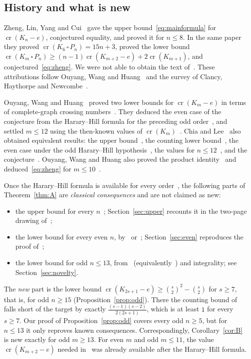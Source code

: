 \documentclass[11pt,a4paper]{article}
\theoremstyle{definition}
\theoremstyle{remark}
\numberwithin{equation}{section}
\newcommand{\crn}{\operatorname{cr}}
\begin{document}
\subsection{History and what is new}

Zheng, Lin, Yang and Cui~\cite{ZLYC} gave the upper bound~\eqref{eq:mainformula} for $\crn(K_n-e)$, conjectured equality, and proved it for $n\le 8$. In the same paper they proved $\crn(K_6\,\square\,P_n)=15n+3$, proved the lower bound $\crn(K_m\,\square\,P_n)\ge(n-1)\crn(K_{m+2}-e)+2\crn(K_{m+1})$, and conjectured~\eqref{eq:zheng}. We were not able to obtain the text of~\cite{ZLYC}. These attributions follow Ouyang, Wang and Huang~\cite[Section~1, display~(1.1)--(1.2), and Lemma~2.3]{OWH} and the survey of Clancy, Haythorpe and Newcombe~\cite[Theorem~2.19, Conjecture~2.20, Theorems~3.12--3.13, Conjecture~3.14]{CHN}.

Ouyang, Wang and Huang~\cite{OWH} proved two lower bounds for $\crn(K_m-e)$ in terms of complete-graph crossing numbers~\cite[Theorems~3.1 and~3.2]{OWH}. They deduced the even case of the conjecture from the Harary--Hill formula for the preceding odd order~\cite[Theorem~3.3]{OWH}, and settled $m\le 12$ using the then-known values of $\crn(K_m)$~\cite[Theorem~3.4]{OWH}. Chia and Lee~\cite{ChiaLee} also obtained equivalent results: the upper bound~\cite[Lemma~1]{ChiaLee}, the counting lower bound~\cite[Theorem~1]{ChiaLee}, the even case under the odd Harary--Hill hypothesis~\cite[Theorem~2]{ChiaLee}, the values for $n\le12$~\cite[Corollary~1]{ChiaLee}, and the conjecture~\cite[Conjecture~1]{ChiaLee}. Ouyang, Wang and Huang also proved the product identity~\cite[Corollary~5.1]{OWH} and deduced~\eqref{eq:zheng} for $m\le 10$~\cite[Corollary~5.2]{OWH}.

Once the Harary--Hill formula is available for every order~\cite{OAIKn}, the following parts of Theorem~\ref{thm:A} are \emph{classical consequences} and are not claimed as new:
\begin{itemize}[leftmargin=1.5em]
\item the upper bound for every $n$~\cite{ZLYC,ChiaLee}; Section~\ref{sec:upper} recounts it in the two-page drawing of~\cite{OAIKn};
\item the lower bound for every even $n$, by~\cite[Theorem~3.3]{OWH} or~\cite[Theorem~2]{ChiaLee}; Section~\ref{sec:even} reproduces the proof of~\cite[Theorem~3.2]{OWH};
\item the lower bound for odd $n\le 13$, from~\cite[Theorem~3.1]{OWH} (equivalently~\cite[Theorem~1]{ChiaLee}) and integrality; see Section~\ref{sec:novelty}.
\end{itemize}
The \emph{new} part is the lower bound $\crn(K_{2s+1}-e)\ge\binom s2^2-\binom s2$ for $s\ge7$, that is, for odd $n\ge 15$ (Proposition~\ref{prop:odd}). There the counting bound of~\cite[Theorem~3.1]{OWH} falls short of the target by exactly $\frac{(s-1)(s-2)}{2(2s+1)}$, which is at least $1$ for every $s\ge 7$. Our proof of Proposition~\ref{prop:odd} covers every odd $n\ge5$, but for $n\le13$ it only reproves known consequences. Correspondingly, Corollary~\ref{cor:B} is new exactly for odd $m\ge 13$. For even $m$ and odd $m\le11$, the value $\crn(K_{m+2}-e)$ needed in~\cite[Corollary~5.1]{OWH} was already available after the Harary--Hill formula.
\end{document}
